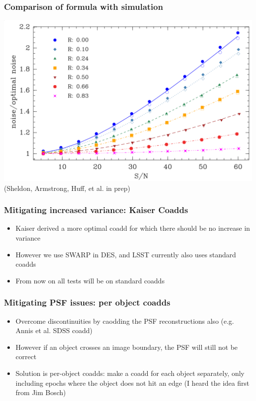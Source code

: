 \documentclass{beamer}
\begin{document}
\frame
{
    \frametitle{Comparison of formula with simulation}
 
    \begin{center}
        \includegraphics[width=\columnwidth]{template-var.png}
        \newline
        (Sheldon, Armstrong, Huff, et al. in prep)
    \end{center}


}

\frame
{
    \frametitle{Mitigating increased variance: Kaiser Coadds}

    \begin{itemize}

        \item Kaiser derived a more optimal coadd for which there should be no increase in variance

        \item However we use SWARP in DES, and LSST currently also uses standard coadds

        \item From now on all tests will be on standard coadds

    \end{itemize}

}



\frame
{
    \frametitle{Mitigating PSF issues: per object coadds}

    \begin{itemize}

        \item Overcome discontinuities by caodding the PSF reconstructions also (e.g. Annis et al. SDSS coadd)

        \item However if an object crosses an image boundary, the PSF will still not be correct

        \item Solution is per-object coadds: make a coadd for each object
            separately, only including epochs where the object does not hit an
            edge (I heard the idea first from Jim Bosch)


    \end{itemize}

}
\end{document}
